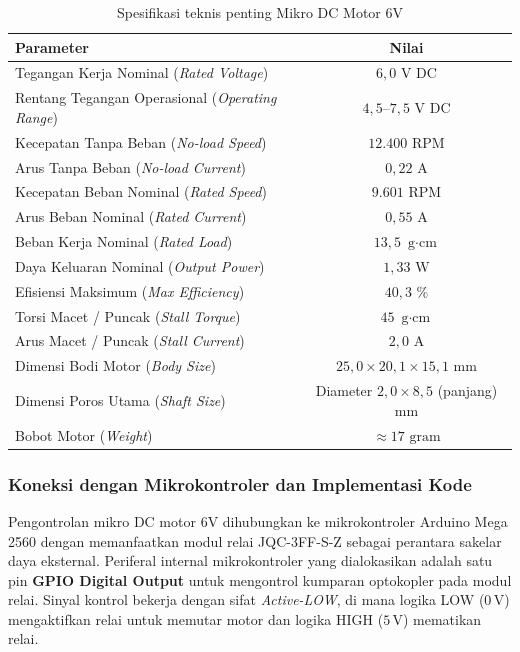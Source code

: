 \begin{table}[H]
	\centering
	\caption{Spesifikasi teknis penting Mikro DC Motor 6V}
	\label{tab:dc_motor_spesifikasi}
	\small
	\begin{tabularx}{\textwidth}{@{} X c  @{}}
		\toprule
		Parameter                                               & Nilai                                                  \\
		\midrule
		Tegangan Kerja Nominal (\textit{Rated Voltage})         & $6{,}0$ $\text{V DC}$            \\
		Rentang Tegangan Operasional (\textit{Operating Range}) & $4{,}5\text{--}7{,}5$ $\text{V DC}$               \\
		Kecepatan Tanpa Beban (\textit{No-load Speed})          & $12.400$ $\text{RPM}$             \\
		Arus Tanpa Beban (\textit{No-load Current})             & $0{,}22$ $\text{A}$               \\
		Kecepatan Beban Nominal (\textit{Rated Speed})          & $9.601$ $\text{RPM}$             \\
		Arus Beban Nominal (\textit{Rated Current})             & $0{,}55$ $\text{A}$               \\
		Beban Kerja Nominal (\textit{Rated Load})               & $13{,}5$ $\text{g}\cdot\text{cm}$ \\
		Daya Keluaran Nominal (\textit{Output Power})           & $1{,}33$ $\text{W}$               \\
		Efisiensi Maksimum (\textit{Max Efficiency})            & $40{,}3$ $\%$                     \\
		Torsi Macet / Puncak (\textit{Stall Torque})            & $45$ $\text{g}\cdot\text{cm}$ \\
		Arus Macet / Puncak (\textit{Stall Current})            & $2{,}0$ $\text{A}$               \\
		Dimensi Bodi Motor (\textit{Body Size})                 & $25{,}0 \times 20{,}1 \times 15{,}1$ $\text{mm}$       \\
		Dimensi Poros Utama (\textit{Shaft Size})               & Diameter $2{,}0 \times 8{,}5$ (panjang) $\text{mm}$    \\
		Bobot Motor (\textit{Weight})                           & $\approx 17$                  $\text{gram}$            \\
		\bottomrule
	\end{tabularx}
\end{table}

\subsubsection{Koneksi dengan Mikrokontroler dan Implementasi Kode}
Pengontrolan mikro DC motor 6V dihubungkan ke mikrokontroler Arduino Mega 2560 dengan memanfaatkan modul relai JQC-3FF-S-Z sebagai perantara sakelar daya eksternal. Periferal internal mikrokontroler yang dialokasikan adalah satu pin \textbf{GPIO Digital Output} untuk mengontrol kumparan optokopler pada modul relai. Sinyal kontrol bekerja dengan sifat \textit{Active-LOW}, di mana logika LOW ($0\,\text{V}$) mengaktifkan relai untuk memutar motor dan logika HIGH ($5\,\text{V}$) mematikan relai.

